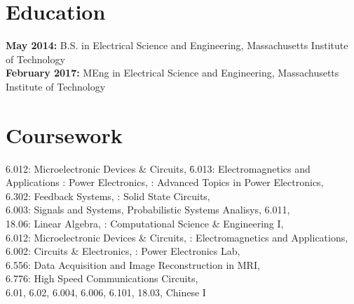 \documentclass{res}
\begin{document}
 


\address{mspatz@mit.edu\\mark.h.spatz@gmail.com  }
\address{(816)-679-1502}

\begin{resume}
        
\section{Education}
\vspace{0.05in} 

{\bf May 2014:} B.S. in Electrical Science and Engineering, Massachusetts Institute of Technology\\
{\bf February 2017:} MEng in Electrical Science and Engineering, Massachusetts Institute of Technology
\section{Coursework}
	\vspace{-0.05in}
	\begin{tabbing}
	6.012: Microelectronic Devices \& Circuits, \=6.013: Electromagnetics and Applications : Power Electronics, : Advanced Topics in Power Electronics,\\
	6.302: Feedback Systems,  : Solid State Circuits,\\
	6.003: Signals and Systems,  Probabilistic Systems Analisys, 6.011,\\
	18.06: Linear Algebra, : Computational Science \& Engineering I,\\
	6.012: Microelectronic Devices \& Circuits, : Electromagnetics and Applications,\\
	6.002: Circuits \& Electronics, : Power Electronics Lab,\\
	6.556: Data Acquisition and Image Reconstruction in MRI,\\
	6.776: High Speed Communications Circuits,\\
	6.01, 6.02, 6.004, 6.006, 6.101, 18.03, Chinese I
	\end{tabbing}


\end{resume}
\end{document}

